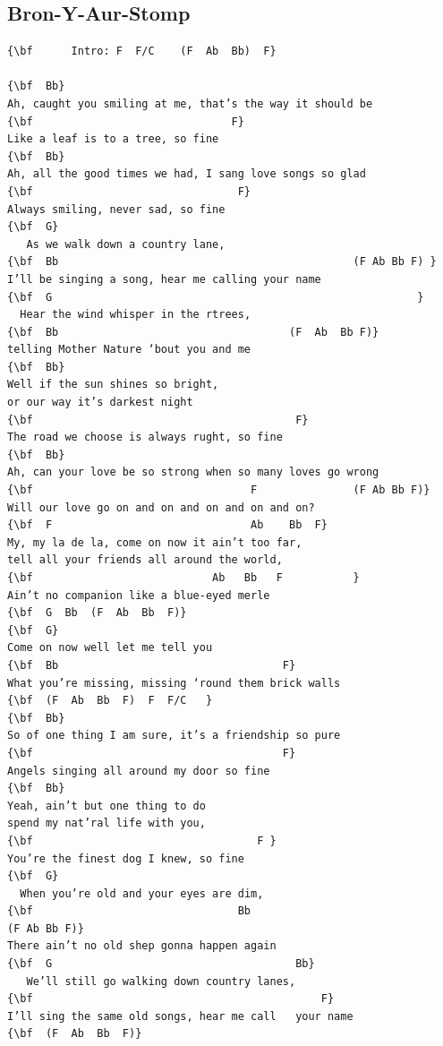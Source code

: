 \documentclass[a4paper]{article}
\begin{document}
\subsection{Bron-Y-Aur-Stomp}
\begin{Verbatim}[commandchars=\\\{\}]
{\bf      Intro: F  F/C    (F  Ab  Bb)  F}

{\bf  Bb}
Ah, caught you smiling at me, that’s the way it should be
{\bf                               F}
Like a leaf is to a tree, so fine
{\bf  Bb}
Ah, all the good times we had, I sang love songs so glad
{\bf                                F}
Always smiling, never sad, so fine
{\bf  G}
   As we walk down a country lane, 
{\bf  Bb                                              (F Ab Bb F) }
I’ll be singing a song, hear me calling your name
{\bf  G                                                         }
  Hear the wind whisper in the rtrees, 
{\bf  Bb                                    (F  Ab  Bb F)}
telling Mother Nature ‘bout you and me
{\bf  Bb}
Well if the sun shines so bright, 
or our way it’s darkest night
{\bf                                         F}
The road we choose is always rught, so fine
{\bf  Bb}
Ah, can your love be so strong when so many loves go wrong 
{\bf                                  F               (F Ab Bb F)}
Will our love go on and on and on and on and on?
{\bf  F                               Ab    Bb  F}
My, my la de la, come on now it ain’t too far, 
tell all your friends all around the world,
{\bf                            Ab   Bb   F           }
Ain’t no companion like a blue-eyed merle
{\bf  G  Bb  (F  Ab  Bb  F)}
{\bf  G}
Come on now well let me tell you
{\bf  Bb                                   F}
What you’re missing, missing ‘round them brick walls
{\bf  (F  Ab  Bb  F)  F  F/C   }
{\bf  Bb}
So of one thing I am sure, it’s a friendship so pure
{\bf                                       F}
Angels singing all around my door so fine
{\bf  Bb}
Yeah, ain’t but one thing to do 
spend my nat’ral life with you,
{\bf                                   F }
You’re the finest dog I knew, so fine
{\bf  G}
  When you’re old and your eyes are dim,
{\bf                                Bb                                        (F Ab Bb F)}
There ain’t no old shep gonna happen again
{\bf  G                                      Bb}
   We’ll still go walking down country lanes, 
{\bf                                             F}
I’ll sing the same old songs, hear me call   your name
{\bf  (F  Ab  Bb  F)}

\end{Verbatim}
\newpage
\end{document}

